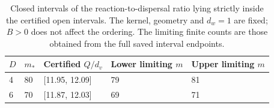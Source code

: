 \begin{table}[htbp]
\centering
\caption{Closed intervals of the reaction-to-dispersal ratio lying strictly inside the certified open intervals. The kernel, geometry and $d_w=1$ are fixed; $B>0$ does not affect the ordering. The limiting finite counts are those obtained from the full saved interval endpoints.}
\label{tab:coupled_ratio_sectors}
\begin{tabular}{lllll}
\toprule
$D$ & $m_*$ & Certified $Q/d_v$ & Lower limiting $m$ & Upper limiting $m$ \\
\midrule
4 & 80 & [11.95, 12.09] & 79 & 81 \\
6 & 70 & [11.87, 12.03] & 69 & 71 \\
\bottomrule
\end{tabular}
\end{table}
